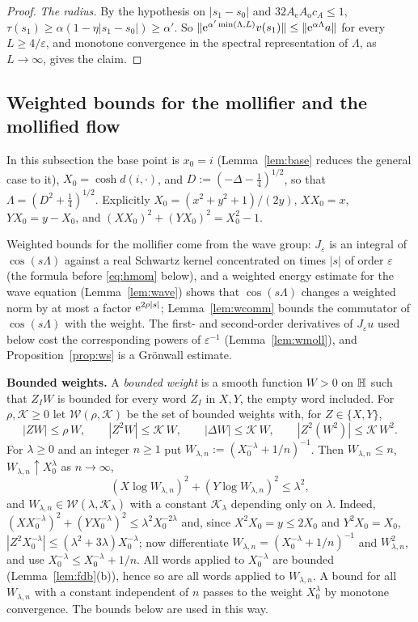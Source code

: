 \begin{proof}
\emph{The radius.} By the hypothesis on $|s_1-s_0|$ and $32A_{\mathrm e}A_{\mathrm o}c_A\le1$,
$\tau(s_1)\ge\alpha(1-\eta|s_1-s_0|)\ge\alpha'$. So $\lVert \mathrm{e}^{\alpha'\min(\Lambda,L)}v(s_1)\rVert\le\lVert \mathrm{e}^{\alpha\Lambda}a\rVert$ for every
$L\ge4/\varepsilon$, and monotone convergence in the spectral representation of $\Lambda$, as $L\to\infty$, gives the claim.
\end{proof}

\subsection{Weighted bounds for the mollifier and the mollified flow}\label{app:ws}
In this subsection the base point is $x_0=i$ (Lemma~\ref{lem:base} reduces the general case to it), $X_0=\cosh d(i,\cdot)$, and
$D:=(-\Delta-\tfrac14)^{1/2}$, so that $\Lambda=(D^2+\tfrac14)^{1/2}$. Explicitly $X_0=(x^2+y^2+1)/(2y)$, $XX_0=x$, $YX_0=y-X_0$, and
$(XX_0)^2+(YX_0)^2=X_0^2-1$.

Weighted bounds for the mollifier come from the wave group: $J_\varepsilon$ is an integral of $\cos(s\Lambda)$ against a real
Schwartz kernel concentrated on times $|s|$ of order $\varepsilon$ (the formula before \eqref{eq:hmom} below), and a weighted energy estimate for
the wave equation (Lemma~\ref{lem:wave}) shows that $\cos(s\Lambda)$ changes a weighted norm by at most a factor $\mathrm{e}^{2\rho|s|}$;
Lemma~\ref{lem:wcomm} bounds the commutator of $\cos(s\Lambda)$ with the weight. The first- and second-order derivatives of $J_\varepsilon u$ used below cost the corresponding powers of $\varepsilon^{-1}$
(Lemma~\ref{lem:wmoll}), and
Proposition~\ref{prop:ws} is a Gr\"onwall estimate.

\medskip\noindent\textbf{Bounded weights.} A \emph{bounded weight} is a smooth function $W>0$ on $\mathbb{H}$ such that $Z_IW$ is bounded
for every word $Z_I$ in $X,Y$, the empty word included. For $\rho,\mathcal K\ge0$ let $\mathcal W(\rho,\mathcal K)$ be the set of bounded weights
with, for $Z\in\{X,Y\}$,
\[
|ZW|\le\rho\,W,\qquad|Z^2W|\le\mathcal K\,W,\qquad|\Delta W|\le\mathcal K\,W,\qquad|Z^2(W^2)|\le\mathcal K\,W^2 .
\]
For $\lambda\ge0$ and an integer $n\ge1$ put $W_{\lambda,n}:=(X_0^{-\lambda}+1/n)^{-1}$. Then $W_{\lambda,n}\le n$,
$W_{\lambda,n}\uparrow X_0^\lambda$ as $n\to\infty$,
\[
(X\log W_{\lambda,n})^2+(Y\log W_{\lambda,n})^2\le\lambda^2,
\]
and $W_{\lambda,n}\in\mathcal W(\lambda,\mathcal K_\lambda)$ with a constant $\mathcal K_\lambda$ depending only on $\lambda$.
Indeed, $(XX_0^{-\lambda})^2+(YX_0^{-\lambda})^2\le\lambda^2X_0^{-2\lambda}$ and, since $X^2X_0=y\le2X_0$ and $Y^2X_0=X_0$,
$|Z^2X_0^{-\lambda}|\le(\lambda^2+3\lambda)X_0^{-\lambda}$; now differentiate $W_{\lambda,n}=(X_0^{-\lambda}+1/n)^{-1}$ and $W_{\lambda,n}^2$,
and use $X_0^{-\lambda}\le X_0^{-\lambda}+1/n$. All words applied to $X_0^{-\lambda}$ are bounded (Lemma~\ref{lem:fdb}(b)), hence so are all words applied to $W_{\lambda,n}$.
A bound for all $W_{\lambda,n}$ with a constant independent of $n$ passes to the weight $X_0^\lambda$ by monotone convergence. The
bounds below are used in this way.

